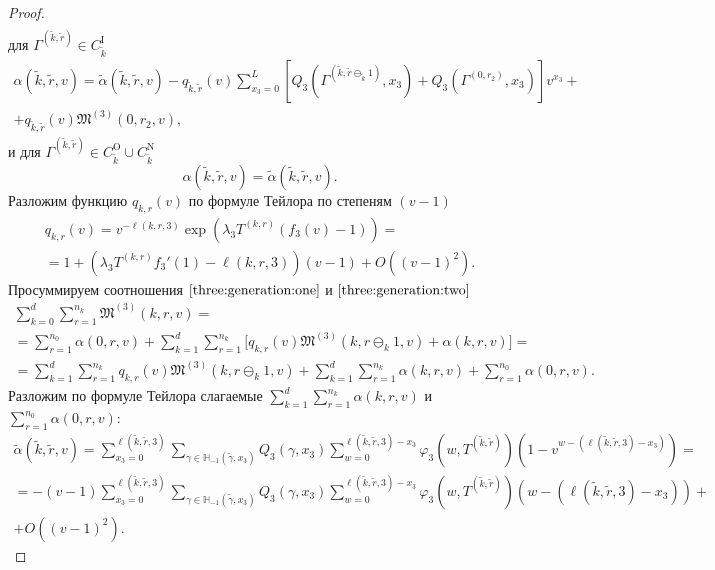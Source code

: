 \begin{proof}
\begin{multline}
\end{multline}
для $ \Gamma^{(\tilde{k},  \tilde{r})} \in C_{\tilde{k}}^{\mathrm{I}}$
\begin{multline}
\alpha(\tilde{k}, \tilde{r}, v) =\tilde{\alpha}(\tilde{k}, \tilde{r}, v) - q_{\tilde{k}, \tilde{r}}(v)\sum_{x_3=0}^{L} \left[ Q_3(\Gamma^{(\tilde{k}, \tilde{r}\ominus_{\tilde{k}} 1)}, x_3) + Q_3(\Gamma^{(0, r_2)}, x_3) \right] v^{x_3}+ \\ 
+ q_{\tilde{k}, \tilde{r}}(v)  \mathfrak{M}^{(3)}(0, r_2, v),
\end{multline}
и для $\Gamma^{(\tilde{k},  \tilde{r})} \in C_{\tilde{k}}^{\mathrm{O}} \cup C_{\tilde{k}}^{\mathrm{N}}$
\begin{equation}
\alpha(\tilde{k}, \tilde{r}, v) =\tilde{\alpha}(\tilde{k}, \tilde{r}, v).
\end{equation}
Разложим функцию $q_{k, r}(v)$ по формуле Тейлора по степеням $(v-1)$
\begin{multline*}
    q_{k, r}(v) =  v^{-\ell(k, r, 3)} \exp{(\lambda_3 T^{(k, r)} (f_3(v)-1))}= \\=1 + (\lambda_3 T^{(k, r)} f_3'(1) - \ell(k, r, 3))(v-1) + O((v-1)^2).
\end{multline*}
Просуммируем соотношения $\eqref{three:generation:one}$ и $\eqref{three:generation:two}$
\begin{multline}
 \sum_{k=0}^{d} \sum_{r=1}^{n_k} \mathfrak{M}^{(3)}(k, r, v) =\\
 =\sum_{r=1}^{n_0} \alpha (0, r, v) + \sum_{k=1}^{d}\sum_{r=1}^{n_k} \bigl[ q_{k, r}(v) \mathfrak{M}^{(3)}(k, r\ominus_k 1, v) + \alpha(k, r, v)\bigr] = \\
 = \sum_{k=1}^{d}\sum_{r=1}^{n_k} q_{k, r}(v) \mathfrak{M}^{(3)}(k, r\ominus_k 1, v)   + \sum_{k=1}^{d}\sum_{r=1}^{n_k} \alpha(k, r, v)  + \sum_{r=1}^{n_0} \alpha (0, r, v).
 \label{summed:neccessary}
\end{multline}
Разложим по формуле Тейлора слагаемые $\sum_{k=1}^{d}\sum_{r=1}^{n_k} \alpha(k, r, v)$ и $\sum_{r=1}^{n_0} \alpha (0, r, v)$:
\begin{multline*}
    \tilde{\alpha} (\tilde{k}, \tilde{r}, v) = \sum_{x_3=0}^{\ell(\tilde{k}, \tilde{r}, 3)}\sum_{\gamma \in {\mathbb H}_{-1}(\tilde{\gamma}, x_3)} Q_3(\gamma, x_3) \sum_{w=0}^{\ell(\tilde{k}, \tilde{r}, 3) - x_3} \varphi_3(w, T^{(\tilde{k}, \tilde{r})}) (1-v^{w-(\ell(\tilde{k}, \tilde{r}, 3)-x_3)})=\\= - (v-1) \sum_{x_3=0}^{\ell(\tilde{k}, \tilde{r}, 3)}\sum_{\gamma \in {\mathbb H}_{-1}(\tilde{\gamma}, x_3)} Q_3(\gamma, x_3) \sum_{w=0}^{\ell(\tilde{k}, \tilde{r}, 3) - x_3} \varphi_3(w, T^{(\tilde{k}, \tilde{r})}) (w-(\ell(\tilde{k}, \tilde{r}, 3)-x_3)) + \\ + O((v-1)^2).

\end{multline*}
\end{proof}
